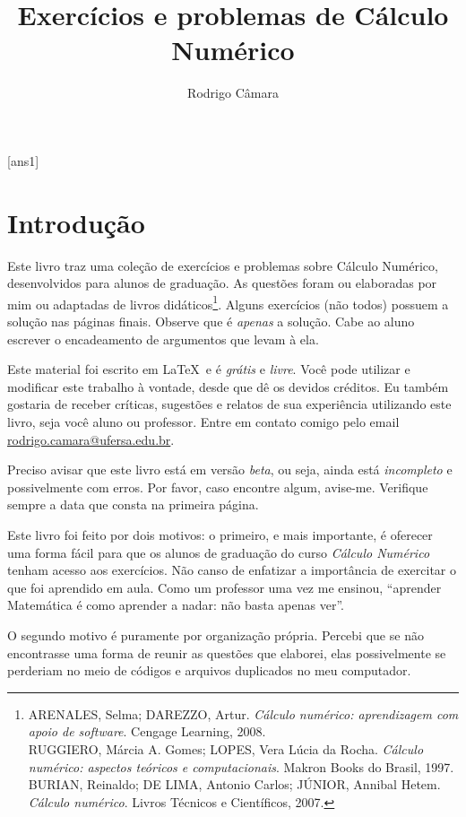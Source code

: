 \documentclass[10pt,a4paper]{report}
\author{Rodrigo Câmara}
\title{Exercícios e problemas de Cálculo Numérico}
\theoremstyle{definition}
\begin{document}
\frenchspacing

\maketitle
\tableofcontents
{}[ans1]
\chapter*{Introdução}

Este livro traz uma coleção de exercícios e problemas sobre Cálculo Numérico, desenvolvidos para alunos de graduação. As questões foram ou elaboradas por mim ou adaptadas de livros didáticos\footnote{ARENALES, Selma; DAREZZO, Artur. \emph{Cálculo numérico: aprendizagem com apoio de software}. Cengage Learning, 2008.\\ RUGGIERO, Márcia A. Gomes; LOPES, Vera Lúcia da Rocha. \emph{Cálculo numérico: aspectos teóricos e computacionais}. Makron Books do Brasil, 1997.\\ BURIAN, Reinaldo; DE LIMA, Antonio Carlos; JÚNIOR, Annibal Hetem. \emph{Cálculo numérico}. Livros Técnicos e Científicos, 2007.}. Alguns exercícios (não todos) possuem a solução nas páginas finais. Observe que é \emph{apenas} a solução. Cabe ao aluno escrever o encadeamento de argumentos que levam à ela.

Este material foi escrito em \LaTeX\ e é \emph{grátis} e \emph{livre}. Você pode utilizar e modificar este trabalho à vontade, desde que dê os devidos créditos. Eu também gostaria de receber críticas, sugestões e relatos de sua experiência utilizando este livro, seja você aluno ou professor. Entre em contato comigo pelo email \url{rodrigo.camara@ufersa.edu.br}.

Preciso avisar que este livro está em versão \emph{beta}, ou seja, ainda está \emph{incompleto} e possivelmente com erros. Por favor, caso encontre algum, avise-me. Verifique sempre a data que consta na primeira página.


Este livro foi feito por dois motivos: o primeiro, e mais importante, é oferecer uma forma fácil para que os alunos de graduação do curso \emph{Cálculo Numérico} tenham acesso aos exercícios. Não canso de enfatizar a importância de exercitar o que foi aprendido em aula. Como um professor uma vez me ensinou, ``aprender Matemática é como aprender a nadar: não basta apenas ver''. 


O segundo motivo é puramente por organização própria. Percebi que se não encontrasse uma forma de reunir as questões que elaborei, elas possivelmente se perderiam no meio de códigos e arquivos duplicados no meu computador.
\end{document}
